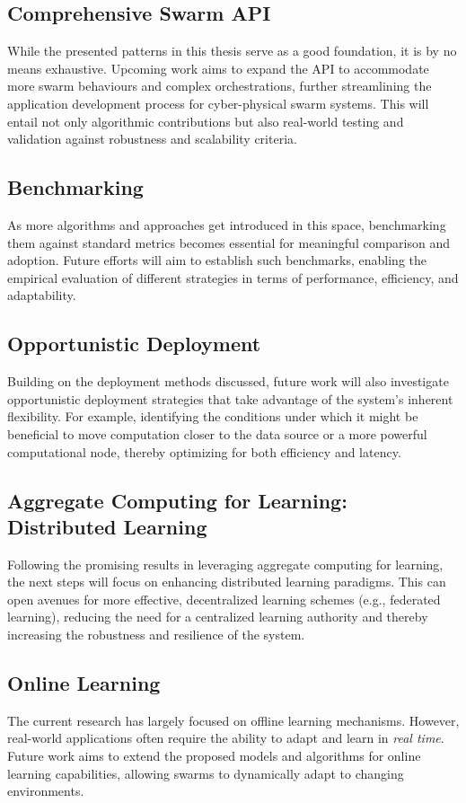 \subsection*{Comprehensive Swarm API}
While the presented patterns in this thesis serve as a good foundation, it is by no means exhaustive. 
 Upcoming work aims to expand the API to accommodate more swarm behaviours and complex orchestrations, 
 further streamlining the application development process for cyber-physical swarm systems. 
 This will entail not only algorithmic contributions but also real-world testing and validation against robustness and scalability criteria.

\subsection*{Benchmarking}
As more algorithms and approaches get introduced in this space, 
 benchmarking them against standard metrics becomes essential for meaningful comparison and adoption.
% 
Future efforts will aim to establish such benchmarks, 
 enabling the empirical evaluation of different strategies in terms of performance, efficiency, and adaptability.

\subsection*{Opportunistic Deployment}
Building on the deployment methods discussed,
 future work will also investigate opportunistic deployment strategies that take advantage of the system's inherent flexibility. 
 For example, 
  identifying the conditions under which it might be beneficial to move computation closer to the data source or a more powerful computational node, 
  thereby optimizing for both efficiency and latency.

\subsection*{Aggregate Computing for Learning: Distributed Learning}
Following the promising results in leveraging aggregate computing for learning, 
 the next steps will focus on enhancing distributed learning paradigms. 
 This can open avenues for more effective, decentralized learning schemes (e.g., federated learning), 
 reducing the need for a centralized learning authority and thereby increasing the robustness and resilience of the system.

\subsection*{Online Learning}
The current research has largely focused on offline learning mechanisms. 
 However, real-world applications often require the ability to adapt and learn in \emph{real time}. 
 Future work aims to extend the proposed models and algorithms for online learning capabilities, 
 allowing swarms to dynamically adapt to changing environments.

